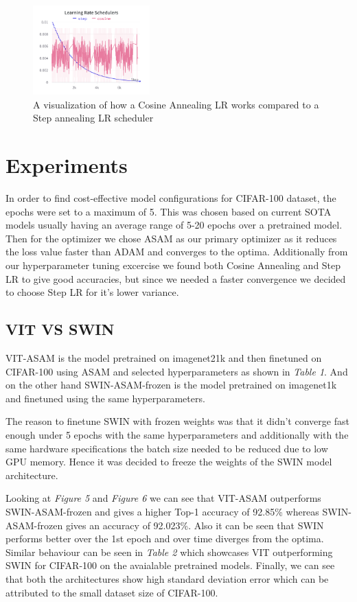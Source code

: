\documentclass{article}
\begin{document}
\begin{figure}[ht]
    \vskip 0.2in
    \centering
    \includegraphics[width=0.4\textwidth]{learning_rate_schedulers.png}
    \caption{A visualization of how a Cosine Annealing LR works compared to a Step annealing LR scheduler}
    \label{fig:foobar}
    \vskip -0.2in
\end{figure}


\section{Experiments}
In order to find cost-effective model configurations for CIFAR-100 dataset, the epochs were set to a maximum of 5.
This was chosen based on current SOTA models usually having an average range of 5-20 epochs over a pretrained model.
Then for the optimizer we chose ASAM as our primary optimizer as it reduces the loss value faster than ADAM and converges to the optima.
Additionally from our hyperparameter tuning excercise we found both Cosine Annealing and Step LR to give good accuracies, but since we needed a faster convergence we decided to choose Step LR for it's lower variance.

\subsection{VIT VS SWIN}
VIT-ASAM is the model pretrained on imagenet21k and then finetuned on CIFAR-100 using ASAM and selected hyperparameters as shown in \textit{Table 1}.
And on the other hand SWIN-ASAM-frozen is the model pretrained on imagenet1k and finetuned using the same hyperparameters.

The reason to finetune SWIN with frozen weights was that it didn't converge fast enough under 5 epochs with the same hyperparameters and additionally with the same hardware specifications the batch size needed to be reduced due to low GPU memory.
Hence it was decided to freeze the weights of the SWIN model architecture.

Looking at \textit{Figure 5} and \textit{Figure 6} we can see that VIT-ASAM outperforms SWIN-ASAM-frozen and gives a higher Top-1 accuracy of 92.85\% whereas SWIN-ASAM-frozen gives an accuracy of 92.023\%.
Also it can be seen that SWIN performs better over the 1st epoch and over time diverges from the optima.
Similar behaviour can be seen in \textit{Table 2} which showcases VIT outperforming SWIN for CIFAR-100 on the avaialable pretrained models.
Finally, we can see that both the architectures show high standard deviation error which can be attributed to the small dataset size of CIFAR-100.
\end{document}
